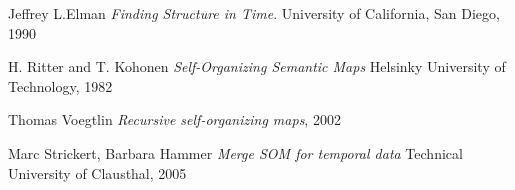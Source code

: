 \documentclass[12pt, oneside]{book}
\begin{document}
\newpage	

\backmatter

\thispagestyle{empty}
\nocite{*}
\clearpage



% 

\begin{thebibliography}{11}
	
Jeffrey L.Elman
\textit{Finding Structure in Time}. 
University of California, San Diego, 1990
 
H. Ritter and T. Kohonen
\textit{Self-Organizing Semantic Maps} 
Helsinky University of Technology, 1982
  
Thomas Voegtlin
\textit{Recursive self-organizing maps}, 2002
 
Marc Strickert, Barbara Hammer
\textit{Merge SOM for temporal data}
Technical University of Clausthal, 2005
\end{thebibliography}



%
%
%
%
\end{document}
